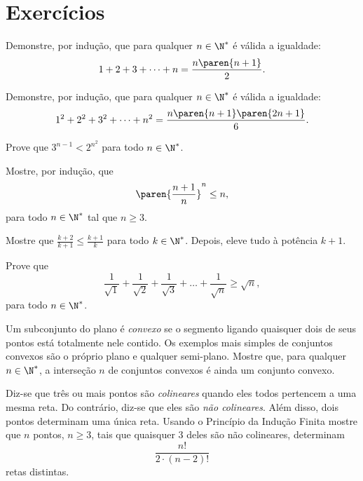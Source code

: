 \section{Exercícios}

\begin{exercise}
Demonstre, por indução, que para qualquer $n \in \N^\ast$ é válida a igualdade:
$$1+2+ 3+ \dots + n = \frac{n \paren {n+1}} 2.$$
\end{exercise}

\begin{exercise}
Demonstre, por indução, que para qualquer $n \in \N^\ast$ é
válida a igualdade:
$$1^2 +2^2 + 3^2+ \dots + n^2 = \frac{n \paren {n+1} \paren{2n+1}} 6.$$
\end{exercise}

\begin{exercise}
Prove que $3^{n-1} < 2^{n^2}$ para todo $n \in \N^\ast$.
\end{exercise}

\begin{exercise}
Mostre, por indução, que
$$\paren{\frac {n+1}{n}}^n \leq n,$$
para todo $n \in \N^\ast$ tal que $n \geq 3$.

\dica Mostre que $\frac{k+2}{k+1} \leq \frac{k+1} k$ para todo $k \in
\N^\ast$. Depois, eleve tudo à potência $k+1$.
\end{exercise}

\begin{exercise}
Prove que
$$\frac 1 {\sqrt 1} +\frac 1 {\sqrt 2} +\frac 1 {\sqrt 3} + \dots + \frac 1 {\sqrt n} \geq \sqrt n,$$
para todo $ n \in \N^\ast$.
\end{exercise}

\begin{exercise}
Um subconjunto do plano é \emph{convexo} se o segmento ligando quaisquer dois de seus pontos está totalmente nele contido.
Os exemplos mais simples de conjuntos convexos são o próprio plano e qualquer semi-plano.
Mostre que, para qualquer $n \in \N^\ast$, a interseção $n$ de conjuntos convexos é ainda um conjunto convexo.
\end{exercise}

\begin{exercise}
Diz-se que três ou mais pontos são \emph{colineares} quando eles todos pertencem a uma mesma reta.
Do contrário, diz-se que eles são \emph{não colineares}.
Além disso, dois pontos determinam uma única reta.
Usando o Princípio da Indução Finita mostre que $n$ pontos, $n\geq 3$, tais que quaisquer 3 deles são não colineares, determinam
$$\frac{n!}{2\cdot(n-2)!}$$
retas distintas.
\end{exercise}